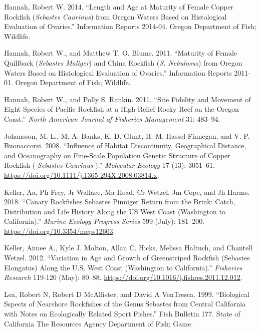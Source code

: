 \documentclass[11pt,
  english,
  letterpaper,
]{article}
\begin{document}
\leavevmode\hypertarget{ref-hannah_length_2014}{}%
Hannah, Robert W. 2014. ``Length and Age at Maturity of Female Copper Rockfish (\emph{Sebastes Caurinus}) from Oregon Waters Based on Histological Evaluation of Ovaries.'' Information Reports 2014-04. Oregon Department of Fish; Wildlife.

\leavevmode\hypertarget{ref-HannahandBlume_maturity_2011}{}%
Hannah, Robert W., and Matthew T. O. Blume. 2011. ``Maturity of Female Quillback (\emph{Sebastes Maliger}) and China Rockfish (\emph{S. Nebulosus}) from Oregon Waters Based on Histological Evaluation of Ovaries.'' Information Reports 2011-01. Oregon Department of Fish; Wildlife.

\leavevmode\hypertarget{ref-HannahandRankin_rockfish_site_fidelity_2011}{}%
Hannah, Robert W., and Polly S. Rankin. 2011. ``Site Fidelity and Movement of Eight Species of Pacific Rockfish at a High-Relief Rocky Reef on the Oregon Coast.'' \emph{North American Journal of Fisheries Management} 31: 483--94.

\leavevmode\hypertarget{ref-johansson_influence_2008}{}%
Johansson, M. L., M. A. Banks, K. D. Glunt, H. M. Hassel-Finnegan, and V. P. Buonaccorsi. 2008. ``Influence of Habitat Discontinuity, Geographical Distance, and Oceanography on Fine-Scale Population Genetic Structure of Copper Rockfish ( \emph{Sebastes Caurinus} ).'' \emph{Molecular Ecology} 17 (13): 3051--61. \url{https://doi.org/10.1111/j.1365-294X.2008.03814.x}.

\leavevmode\hypertarget{ref-keller_canary_2018}{}%
Keller, Aa, Ph Frey, Jr Wallace, Ma Head, Cr Wetzel, Jm Cope, and Jh Harms. 2018. ``Canary Rockfishes Sebastes Pinniger Return from the Brink: Catch, Distribution and Life History Along the US West Coast (Washington to California).'' \emph{Marine Ecology Progress Series} 599 (July): 181--200. \url{https://doi.org/10.3354/meps12603}.

\leavevmode\hypertarget{ref-keller_variation_2012}{}%
Keller, Aimee A., Kyle J. Molton, Allan C. Hicks, Melissa Haltuch, and Chantell Wetzel. 2012. ``Variation in Age and Growth of Greenstriped Rockfish (Sebastes Elongatus) Along the U.S. West Coast (Washington to California).'' \emph{Fisheries Research} 119-120 (May): 80--88. \url{https://doi.org/10.1016/j.fishres.2011.12.012}.

\leavevmode\hypertarget{ref-lea_biological_1999}{}%
Lea, Robert N, Robert D McAllister, and David A VenTresca. 1999. ``Biological Sspects of Nearshore Rockfishes of the Genus Sebastes from Central California with Notes on Ecologically Related Sport Fishes.'' Fish Bulletin 177. State of California The Resources Agency Department of Fish; Game.
\end{document}
